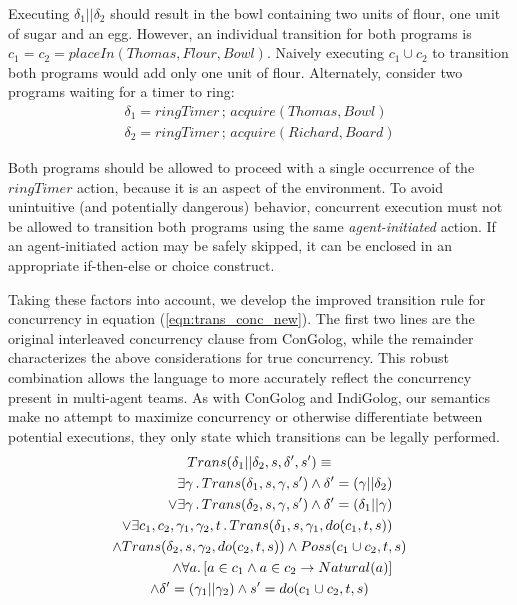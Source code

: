 \documentclass[times, 10pt, twocolumn]{article}
\begin{document}
Executing $\delta_{1}||\delta_{2}$ should result in the bowl containing
two units of flour, one unit of sugar and an egg. However, an individual
transition for both programs is $c_{1}=c_{2}=placeIn(Thomas,Flour,Bowl)$.
Naively executing $c_{1}\cup c_{2}$ to transition both programs would
add only one unit of flour. Alternately, consider two programs waiting
for a timer to ring:
\begin{gather*}
\delta_{1}=ringTimer\,;\, acquire(Thomas,Bowl)\\
\delta_{2}=ringTimer\,;\, acquire(Richard,Board)
\end{gather*}

Both programs should be allowed to proceed with a single occurrence
of the $ringTimer$ action, because it is an aspect of the environment.
To avoid unintuitive (and potentially dangerous) behavior, concurrent
execution must not be allowed to transition both programs using the
same \emph{agent-initiated} action. If an agent-initiated action may
be safely skipped, it can be enclosed in an appropriate if-then-else
or choice construct.

Taking these factors into account, we develop the improved transition
rule for concurrency in equation (\ref{eqn:trans_conc_new}). The
first two lines are the original interleaved concurrency clause from
ConGolog, while the remainder characterizes the above considerations
for true concurrency. This robust combination allows the language
to more accurately reflect the concurrency present in multi-agent
teams. As with ConGolog and IndiGolog, our semantics make no attempt
to maximize concurrency or otherwise differentiate between potential
executions, they only state which transitions can be legally performed.
\begin{multline}
Trans(\delta_{1}||\delta_{2},s,\delta',s')\equiv\\
\shoveright{\exists\gamma\,.\, Trans(\delta_{1},s,\gamma,s')\wedge\delta'=(\gamma||\delta_{2})}\\
\shoveright{\vee\exists\gamma\,.\, Trans(\delta_{2},s,\gamma,s')\wedge\delta'=(\delta_{1}||\gamma)}\\
\shoveright{\vee\exists c_{1},c_{2},\gamma_{1},\gamma_{2},t\,.\, Trans(\delta_{1},s,\gamma_{1},do(c_{1},t,s))}\\
\wedge Trans(\delta_{2},s,\gamma_{2},do(c_{2},t,s))\wedge Poss(c_{1}\cup c_{2},t,s)\\
\shoveright{\wedge\forall a.\left[a\in c_{1}\wedge a\in c_{2}\rightarrow Natural(a)\right]}\\
\wedge\delta'=(\gamma_{1}||\gamma_{2})\wedge s'=do(c_{1}\cup c_{2},t,s)\label{eqn:trans_conc_new}
\end{multline}
\end{document}
